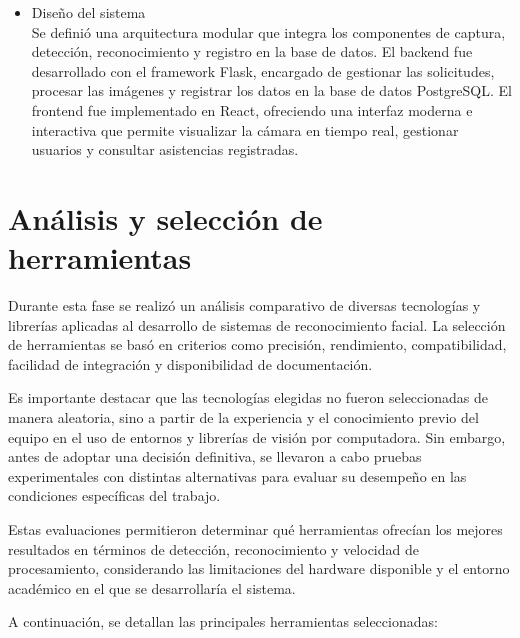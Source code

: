 \begin{itemize}
  \item Diseño del sistema \\
  Se definió una arquitectura modular que integra los componentes de captura, detección, reconocimiento y registro en la base de datos.  
  El backend fue desarrollado con el framework Flask, encargado de gestionar las solicitudes, procesar las imágenes y registrar los datos en la base de datos PostgreSQL.  
  El frontend fue implementado en React, ofreciendo una interfaz moderna e interactiva que permite visualizar la cámara en tiempo real, gestionar usuarios y consultar asistencias registradas.

\end{itemize}



\section{Análisis y selección de herramientas}

Durante esta fase se realizó un análisis comparativo de diversas tecnologías y librerías aplicadas al desarrollo de sistemas de reconocimiento facial. La selección de herramientas se basó en criterios como precisión, rendimiento, compatibilidad, facilidad de integración y disponibilidad de documentación.

Es importante destacar que las tecnologías elegidas no fueron seleccionadas de manera aleatoria, sino a partir de la experiencia y el conocimiento previo del equipo en el uso de entornos y librerías de visión por computadora. Sin embargo, antes de adoptar una decisión definitiva, se llevaron a cabo pruebas experimentales con distintas alternativas para evaluar su desempeño en las condiciones específicas del trabajo.

Estas evaluaciones permitieron determinar qué herramientas ofrecían los mejores resultados en términos de detección, reconocimiento y velocidad de procesamiento, considerando las limitaciones del hardware disponible y el entorno académico en el que se desarrollaría el sistema.

A continuación, se detallan las principales herramientas seleccionadas:

